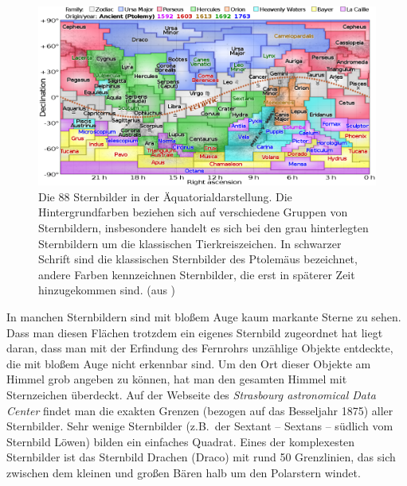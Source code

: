 \begin{figure}[htb]
\includegraphics[width=\textwidth]{./Bilder/Constellations.png} 
\caption{\label{fig_Sternbilder}%
Die 88 Sternbilder in der \"Aquatorialdarstellung. Die Hintergrundfarben beziehen sich auf verschiedene Gruppen
von Sternbildern, insbesondere handelt es sich bei den grau hinterlegten Sternbildern um die klassischen
Tierkreiszeichen. In schwarzer Schrift sind die klassischen Sternbilder des Ptolem\"aus bezeichnet, andere
Farben kennzeichnen Sternbilder, die erst in sp\"aterer Zeit hinzugekommen sind. (aus \cite{Sternbilder})}
\end{figure}

In manchen Sternbildern sind mit blo\ss em Auge kaum markante Sterne zu sehen. 
Dass man diesen Fl\"achen trotzdem 
ein eigenes Sternbild zugeordnet hat liegt daran, dass man mit der Erfindung des Fernrohrs unz\"ahlige Objekte
entdeckte, die mit blo\ss em Auge nicht erkennbar sind. Um den Ort dieser Objekte am Himmel grob angeben
zu k\"onnen, hat man den gesamten Himmel mit Sternzeichen \"uberdeckt. Auf der Webseite des 
\textit{Strasbourg astronomical Data Center} \cite{IAU_Daten}
findet man die exakten Grenzen (bezogen auf das Besseljahr 1875)
aller Sternbilder. Sehr wenige Sternbilder (z.B.\ der Sextant -- Sextans -- 
s\"udlich vom Sternbild L\"owen) bilden
ein einfaches Quadrat. Eines der komplexesten Sternbilder ist das Sternbild 
Drachen (Draco) mit rund
50 Grenzlinien, das sich zwischen dem kleinen und gro\ss en B\"aren halb um den Polarstern windet.   

